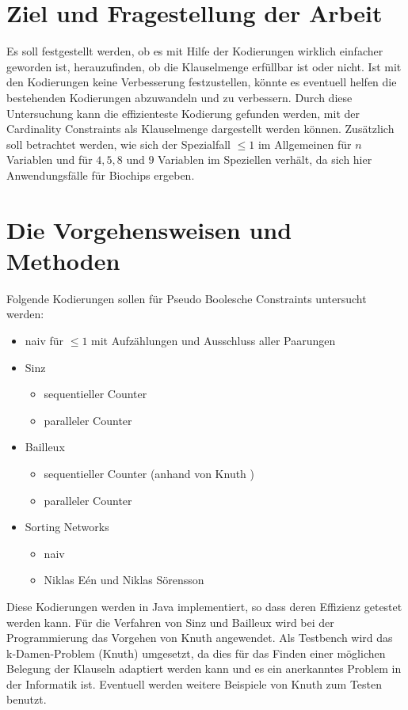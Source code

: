 \documentclass[a4,abstract=on]{scrartcl}
\begin{document}
\section{Ziel und Fragestellung der Arbeit}
Es soll festgestellt werden, ob es mit Hilfe der Kodierungen wirklich einfacher geworden ist, herauzufinden, ob die Klauselmenge erfüllbar ist oder nicht. Ist mit den Kodierungen keine Verbesserung festzustellen, könnte es eventuell helfen die bestehenden Kodierungen abzuwandeln und zu verbessern. 
Durch diese Untersuchung kann die effizienteste Kodierung gefunden werden, mit der Cardinality Constraints als Klauselmenge dargestellt werden können. Zusätzlich soll betrachtet werden, wie sich der Spezialfall $\leq 1$  im Allgemeinen für $n$ Variablen und für $4, 5, 8$ und $9$ Variablen im Speziellen verhält, da sich hier Anwendungsfälle für Biochips ergeben.

\noindent
\section{Die Vorgehensweisen und Methoden}
Folgende Kodierungen sollen für Pseudo Boolesche Constraints untersucht werden:\\
\begin{itemize}
\item naiv für $\leq 1$ mit Aufzählungen und Ausschluss aller Paarungen
\item Sinz \cite[][]{sinz}
	\begin{itemize}
	\item sequentieller Counter
	\item paralleler Counter
	\end{itemize}
\item Bailleux \cite[][]{bailleux}
	\begin{itemize}
	\item sequentieller Counter (anhand von Knuth \cite[][]{knuth})
	\item paralleler Counter 
	\end{itemize}
\item Sorting Networks
	\begin{itemize}
	\item naiv
	\item Niklas Eén und Niklas Sörensson \cite[][]{niklasse}
	\end{itemize}
\end{itemize}
Diese Kodierungen werden in Java implementiert, so dass deren Effizienz getestet werden kann. Für die Verfahren von Sinz und Bailleux wird bei der Programmierung das Vorgehen von Knuth angewendet.
Als Testbench wird das k-Damen-Problem (Knuth) umgesetzt, da dies für das Finden einer möglichen Belegung der Klauseln adaptiert werden kann und es ein anerkanntes Problem in der Informatik ist. Eventuell werden weitere Beispiele von Knuth zum Testen benutzt.
\end{document}
